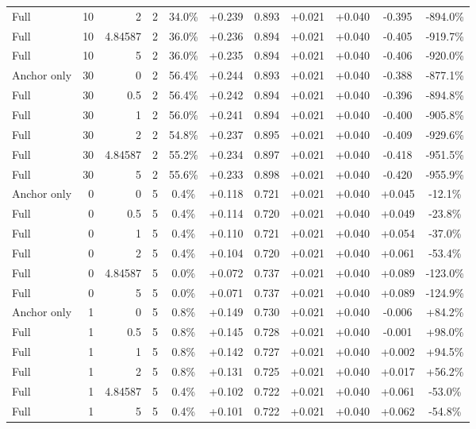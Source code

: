 \begin{table}[htbp]
\begin{tabular}{lrrrccccccc}
Full & 10 & 2 & 2 & 34.0\% & +0.239 & 0.893 & +0.021 & +0.040 & -0.395 & -894.0\% \\
Full & 10 & 4.84587 & 2 & 36.0\% & +0.236 & 0.894 & +0.021 & +0.040 & -0.405 & -919.7\% \\
Full & 10 & 5 & 2 & 36.0\% & +0.235 & 0.894 & +0.021 & +0.040 & -0.406 & -920.0\% \\
Anchor only & 30 & 0 & 2 & 56.4\% & +0.244 & 0.893 & +0.021 & +0.040 & -0.388 & -877.1\% \\
Full & 30 & 0.5 & 2 & 56.4\% & +0.242 & 0.894 & +0.021 & +0.040 & -0.396 & -894.8\% \\
Full & 30 & 1 & 2 & 56.0\% & +0.241 & 0.894 & +0.021 & +0.040 & -0.400 & -905.8\% \\
Full & 30 & 2 & 2 & 54.8\% & +0.237 & 0.895 & +0.021 & +0.040 & -0.409 & -929.6\% \\
Full & 30 & 4.84587 & 2 & 55.2\% & +0.234 & 0.897 & +0.021 & +0.040 & -0.418 & -951.5\% \\
Full & 30 & 5 & 2 & 55.6\% & +0.233 & 0.898 & +0.021 & +0.040 & -0.420 & -955.9\% \\
Anchor only & 0 & 0 & 5 & 0.4\% & +0.118 & 0.721 & +0.021 & +0.040 & +0.045 & -12.1\% \\
Full & 0 & 0.5 & 5 & 0.4\% & +0.114 & 0.720 & +0.021 & +0.040 & +0.049 & -23.8\% \\
Full & 0 & 1 & 5 & 0.4\% & +0.110 & 0.721 & +0.021 & +0.040 & +0.054 & -37.0\% \\
Full & 0 & 2 & 5 & 0.4\% & +0.104 & 0.720 & +0.021 & +0.040 & +0.061 & -53.4\% \\
Full & 0 & 4.84587 & 5 & 0.0\% & +0.072 & 0.737 & +0.021 & +0.040 & +0.089 & -123.0\% \\
Full & 0 & 5 & 5 & 0.0\% & +0.071 & 0.737 & +0.021 & +0.040 & +0.089 & -124.9\% \\
Anchor only & 1 & 0 & 5 & 0.8\% & +0.149 & 0.730 & +0.021 & +0.040 & -0.006 & +84.2\% \\
Full & 1 & 0.5 & 5 & 0.8\% & +0.145 & 0.728 & +0.021 & +0.040 & -0.001 & +98.0\% \\
Full & 1 & 1 & 5 & 0.8\% & +0.142 & 0.727 & +0.021 & +0.040 & +0.002 & +94.5\% \\
Full & 1 & 2 & 5 & 0.8\% & +0.131 & 0.725 & +0.021 & +0.040 & +0.017 & +56.2\% \\
Full & 1 & 4.84587 & 5 & 0.4\% & +0.102 & 0.722 & +0.021 & +0.040 & +0.061 & -53.0\% \\
Full & 1 & 5 & 5 & 0.4\% & +0.101 & 0.722 & +0.021 & +0.040 & +0.062 & -54.8\% \\

\end{tabular}
\end{table}
